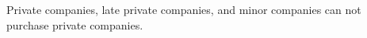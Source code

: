 \documentclass{article}
\begin{document}
\begin{CJK}{UTF8}{min}
Private companies, late private companies, and minor companies can
not purchase private companies.













\end{CJK}
\end{document}
